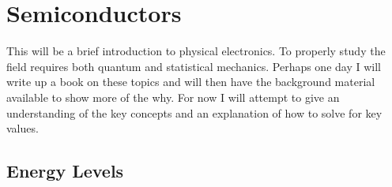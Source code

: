 \chapter{Semiconductors}

This will be a brief introduction to physical electronics.  To properly study the field requires both quantum and statistical mechanics.  Perhaps one day I will write up a book on these topics and will then have the background material available to show more of the why.  For now I will attempt to give an understanding of the key concepts and an explanation of how to solve for key values.

\section{Energy Levels}

